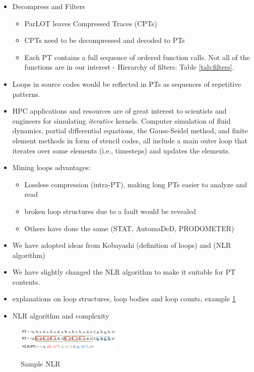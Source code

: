 \begin{itemize}
	\item Decompress and Filters
	\begin{itemize}
		\item ParLOT leaves Compressed Traces (CPTs)
		\item CPTs need to be decompressed and decoded to PTs 
		\item Each PT contains a full sequence of ordered function calls. Not all of the functions are in our interest - Hierarchy of filters: Table \ref{tab:filters}.  
	\end{itemize}
	\item Loops in source codes would be reflected in PTs as sequences of repetitive patterns.
	\item HPC applications and resources are of great interest to scientists and engineers for simulating \textit{iterative} kernels. Computer simulation of fluid dynamics, partial differential equations, the Gauss-Seidel method, and finite element methods in form of stencil codes, all include a main outer loop that iterates over some elements (i.e., timesteps) and updates the elements.
	\item Mining loops advantages:
	\begin{itemize}
		\item Lossless compression (intra-PT), making long PTs easier to analyze and read
		\item broken loop structures due to a fault would be revealed
		\item Others have done the same (STAT, AutomaDeD, PRODOMETER) 
	\end{itemize}
	\item We have adopted ideas from Kobayashi \cite{kobayashi-84} (definition of loops) and \cite{Ketterlin-nlr} (NLR algorithm)
	\item We have slightly changed the NLR algorithm to make it suitable for PT contents.
	 
	\item explanations on loop structures, loop bodies and loop counts, example \ref{fig.NLRexample}
	\item NLR algorithm and complexity
\end{itemize}




\begin{figure}[]
\caption{Sample NLR}
\includegraphics[width=0.45\textwidth]{figs/NLRexample.png}
\label{fig.NLRexample}
\end{figure}

